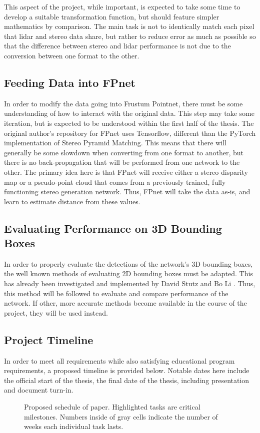 This aspect of the project, while important, is expected to take some time to develop a suitable transformation function, but should feature simpler mathematics by comparison. The main task is not to identically match each pixel that lidar and stereo data share, but rather to reduce error as much as possible so that the difference between stereo and lidar performance is not due to the conversion between one format to the other.

\subsection{Feeding Data into FPnet}
In order to modify the data going into Frustum Pointnet, there must be some understanding of how to interact with the original data. This step may take some iteration, but is expected to be understood within the first half of the thesis. The original author's repository for FPnet uses Tensorflow, different than the PyTorch implementation of Stereo Pyramid Matching. This means that there will generally be some slowdown when converting from one format to another, but there is no back-propagation that will be performed from one network to the other. The primary idea here is that FPnet will receive either a stereo disparity map or a pseudo-point cloud that comes from a previously trained, fully functioning stereo generation network. Thus, FPnet will take the data as-is, and learn to estimate distance from these values.

\subsection{Evaluating Performance on 3D Bounding Boxes}
In order to properly evaluate the detections of the network's 3D bounding boxes, the well known methods of evaluating 2D bounding boxes must be adapted. This has already been investigated and implemented by David Stutz and Bo Li \cite{kitti_3d_board}. Thus, this method will be followed to evaluate and compare performance of the network. If other, more accurate methods become available in the course of the project, they will be used instead.

\subsection{Project Timeline}
In order to meet all requirements while also satisfying educational program requirements, a proposed timeline is provided below. Notable dates here include the official start of the thesis, the final date of the thesis, including presentation and document turn-in.

\begin{figure}[h] %
    \caption{Proposed schedule of paper. Highlighted tasks are critical milestones. Numbers inside of gray cells indicate the number of weeks each individual task lasts.}
\end{figure}

\newpage

